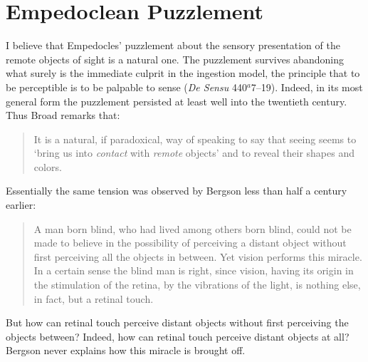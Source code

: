 
\section{Empedoclean Puzzlement} %
\label{sec:empedoclean_puzzlement}

I believe that Empedocles' puzzlement about the sensory presentation of the remote objects of sight is a natural one. The puzzlement survives abandoning what surely is the immediate culprit in the ingestion model, the principle that to be perceptible is to be palpable to sense (\emph{De Sensu} 440\( ^{a} \)7--19). Indeed, in its most general form the puzzlement persisted at least well into the twentieth century. Thus Broad remarks that:
\begin{quote}
    It is a natural, if paradoxical, way of speaking to say that seeing seems to `bring us into \emph{contact} with \emph{remote} objects' and to reveal their shapes and colors. \citep[33]{Broad:1952kx}
\end{quote}
Essentially the same tension was observed by Bergson less than half a century earlier:
\begin{quote}
	A man born blind, who had lived among others born blind, could not be made to believe in the possibility of perceiving a distant object without first perceiving all the objects in between. Yet vision performs this miracle. In a certain sense the blind man is right, since vision, having its origin in the stimulation of the retina, by the vibrations of the light, is nothing else, in fact, but a retinal touch. \citep[168]{Bergson:1907sh}
\end{quote}
But how can retinal touch perceive distant objects without first perceiving the objects between? Indeed, how can retinal touch perceive distant objects at all? Bergson never explains how this miracle is brought off.

